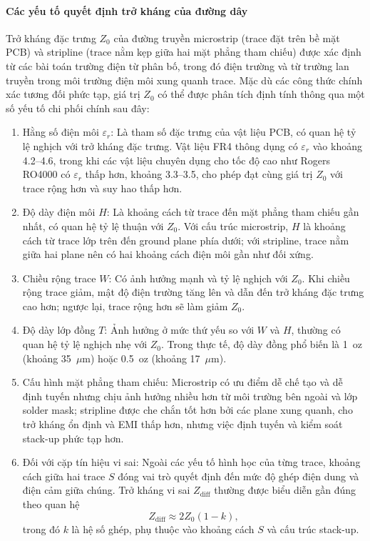                     \paragraph{Các yếu tố quyết định trở kháng của đường dây}
                        Trở kháng đặc trưng \(Z_0\) của đường truyền microstrip (trace đặt trên bề mặt PCB) và stripline (trace nằm kẹp giữa hai mặt phẳng tham chiếu) được xác định từ các bài toán trường điện từ phân bố, trong đó điện trường và từ trường lan truyền trong môi trường điện môi xung quanh trace. Mặc dù các công thức chính xác tương đối phức tạp, giá trị \(Z_0\) có thể được phân tích định tính thông qua một số yếu tố chi phối chính sau đây:

                        \begin{enumerate}
                            \item Hằng số điện môi \(\varepsilon_r\): Là tham số đặc trưng của vật liệu PCB, có quan hệ tỷ lệ nghịch với trở kháng đặc trưng. Vật liệu FR4 thông dụng có \(\varepsilon_r\) vào khoảng 4.2–4.6, trong khi các vật liệu chuyên dụng cho tốc độ cao như Rogers RO4000 có \(\varepsilon_r\) thấp hơn, khoảng 3.3–3.5, cho phép đạt cùng giá trị \(Z_0\) với trace rộng hơn và suy hao thấp hơn.
                            \item Độ dày điện môi \(H\): Là khoảng cách từ trace đến mặt phẳng tham chiếu gần nhất, có quan hệ tỷ lệ thuận với \(Z_0\). Với cấu trúc microstrip, \(H\) là khoảng cách từ trace lớp trên đến ground plane phía dưới; với stripline, trace nằm giữa hai plane nên có hai khoảng cách điện môi gần như đối xứng.
                            \item Chiều rộng trace \(W\): Có ảnh hưởng mạnh và tỷ lệ nghịch với \(Z_0\). Khi chiều rộng trace giảm, mật độ điện trường tăng lên và dẫn đến trở kháng đặc trưng cao hơn; ngược lại, trace rộng hơn sẽ làm giảm \(Z_0\).
                            \item Độ dày lớp đồng \(T\): Ảnh hưởng ở mức thứ yếu so với \(W\) và \(H\), thường có quan hệ tỷ lệ nghịch nhẹ với \(Z_0\). Trong thực tế, độ dày đồng phổ biến là 1~oz (khoảng 35~\(\mu\)m) hoặc 0.5~oz (khoảng 17~\(\mu\)m).
                            \item Cấu hình mặt phẳng tham chiếu: Microstrip có ưu điểm dễ chế tạo và dễ định tuyến nhưng chịu ảnh hưởng nhiều hơn từ môi trường bên ngoài và lớp solder mask; stripline được che chắn tốt hơn bởi các plane xung quanh, cho trở kháng ổn định và EMI thấp hơn, nhưng việc định tuyến và kiểm soát stack-up phức tạp hơn.
                            \item Đối với cặp tín hiệu vi sai: Ngoài các yếu tố hình học của từng trace, khoảng cách giữa hai trace \(S\) đóng vai trò quyết định đến mức độ ghép điện dung và điện cảm giữa chúng. Trở kháng vi sai \(Z_{\text{diff}}\) thường được biểu diễn gần đúng theo quan hệ
                            \[
                                Z_{\text{diff}} \approx 2 Z_0 (1 - k),
                            \]
                            trong đó \(k\) là hệ số ghép, phụ thuộc vào khoảng cách \(S\) và cấu trúc stack-up.
                        \end{enumerate}
                        
